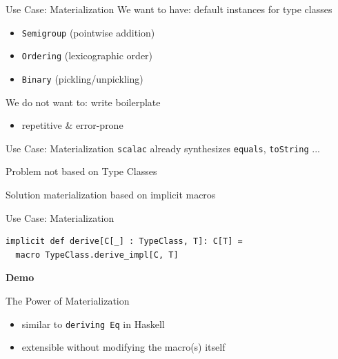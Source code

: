 \documentclass{beamer}
\newcommand\demoslide{
  {
    \setbeamertemplate{background}{}
    \begin{frame}[plain]
      \begin{center}\Large\bfseries Demo\end{center}
    \end{frame}
  }
}
\begin{document}
\begin{frame}{Use Case: Materialization}
  We want to have: default instances for type classes
  \begin{itemize}
    \item \texttt{Semigroup} (pointwise addition)
    \item \texttt{Ordering} (lexicographic order)
    \item \texttt{Binary} (pickling/unpickling)
  \end{itemize}

  \vspace{1em}
  We do not want to: write boilerplate
  \begin{itemize}
    \item repetitive \& error-prone
  \end{itemize}
\end{frame}

\begin{frame}{Use Case: Materialization}
  \texttt{scalac} already synthesizes \texttt{equals}, \texttt{toString} ...

  \vspace{1em}
  \begin{alertblock}{Problem}
    not based on Type Classes
  \end{alertblock}

  \vspace{1em}
  \begin{exampleblock}{Solution}
    materialization based on implicit macros
  \end{exampleblock}
\end{frame}

\begin{frame}[fragile]{Use Case: Materialization}
  \begin{verbatim}
implicit def derive[C[_] : TypeClass, T]: C[T] =
  macro TypeClass.derive_impl[C, T]
  \end{verbatim}
\end{frame}

\demoslide

\begin{frame}{The Power of Materialization}
  \begin{itemize}
    \item similar to \texttt{deriving Eq} in Haskell
    \item extensible without modifying the macro(s) itself
  \end{itemize}
\end{frame}
\end{document}
